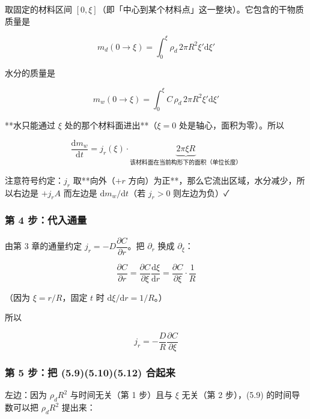取固定的材料区间 $[0,\xi]$（即「中心到某个材料点」这一整块）。它包含的干物质质量是


\begin{equation}
m_d(0\to\xi)=\int_0^{\xi}\rho_d\,2\pi R^2\xi'\mathrm{d}\xi'\tag{5.8}
\end{equation}


水分的质量是


\begin{equation}
m_w(0\to\xi)=\int_0^{\xi}C\,\rho_d\,2\pi R^2\xi'\mathrm{d}\xi'\tag{5.9}
\end{equation}


**水只能通过 $\xi$ 处的那个材料面进出**（$\xi=0$ 处是轴心，面积为零）。所以


\begin{equation}
\frac{\mathrm{d} m_w}{\mathrm{d} t}=j_r(\xi)\cdot\underbrace{2\pi\xi R}_{\text{该材料面在当前构形下的面积（单位长度）}}\tag{5.10}
\end{equation}


注意符号约定：$j_r$ 取**向外（$+r$ 方向）为正**，那么它流出区域，水分减少，所以右边是 $+j_rA$ 而左边是 $\mathrm{d} m_w/\mathrm{d} t$（若 $j_r>0$ 则左边为负）✓


\subsubsection{第 4 步：代入通量}


由第 3 章的通量约定 $j_r=-D\dfrac{\partial C}{\partial r}$。把 $\partial_r$ 换成 $\partial_\xi$：


\begin{equation}
\frac{\partial C}{\partial r}=\frac{\partial C}{\partial \xi}\frac{\mathrm{d}\xi}{\mathrm{d} r}=\frac{\partial C}{\partial\xi}\cdot\frac{1}{R}\tag{5.11}
\end{equation}


（因为 $\xi=r/R$，固定 $t$ 时 $\mathrm{d}\xi/\mathrm{d} r=1/R$。）


所以


\begin{equation}
j_r=-\frac{D}{R}\frac{\partial C}{\partial \xi}\tag{5.12}
\end{equation}


\subsubsection{第 5 步：把 (5.9)(5.10)(5.12) 合起来}


左边：因为 $\rho_dR^2$ 与时间无关（第 1 步）且与 $\xi$ 无关（第 2 步），(5.9) 的时间导数可以把 $\rho_dR^2$ 提出来：


